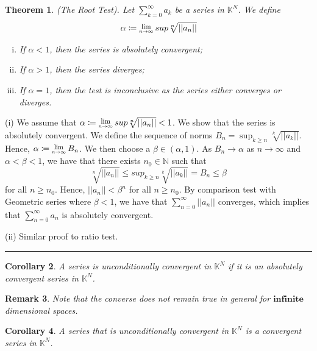 \documentclass[twoside]{article}
\newcounter{lecnum}
\newcommand{\Lim}[1]{\raisebox{0.5ex}{\scalebox{0.8}{$\displaystyle \lim_{#1}\;$}}}
\newtheorem{theorem}{Theorem}[lecnum]
\newtheorem{remark}[theorem]{Remark}
\newtheorem{corollary}[theorem]{Corollary}
\newenvironment{proof}{{\bf Proof:}}{\hfill\rule{2mm}{2mm}}
\begin{document}
\begin{theorem}(The Root Test). Let $\sum_{k=0}^{\infty}a_k$ be a series in $\mathbb{K}^N$. We define
$$
\alpha \coloneqq \Lim{n \rightarrow \infty}sup \sqrt[n]{||a_n||}
$$

\begin{enumerate}[(i)]
  \item If $\alpha < 1$, then the series is absolutely convergent;
  \item If $\alpha > 1$, then the series diverges;
  \item If $\alpha = 1$, then the test is inconclusive as the series either converges or diverges.
\end{enumerate}
\end{theorem}

\begin{proof}
(i) We assume that $\alpha \coloneqq \Lim{n \rightarrow \infty}sup\sqrt[n]{||a_n||} < 1$. We show that the series is absolutely convergent. We define the sequence of norms $B_n = \sup_{k \geq n}\sqrt[k]{||a_k||}$. Hence, $\alpha \coloneqq \Lim{n \rightarrow \infty}B_n$. We then choose a $\beta \in (\alpha,1)$. As $B_n \rightarrow \alpha$ as $n \rightarrow \infty$ and $\alpha < \beta < 1$, we have that there exists $n_0 \in \mathbb{N}$ such that
$$
\sqrt[n]{||a_n||} \leq sup_{k \geq n}\sqrt[k]{||a_k||} = B_n \leq \beta
$$
for all $n \geq n_0$. Hence, $||a_n|| < \beta^n$ for all $n \geq n_0$. By comparison test with Geometric series where $\beta < 1$, we have that $\sum_{n=0}^{\infty}||a_n||$ converges, which implies that $\sum_{n=0}^{\infty}a_n$ is absolutely convergent.

(ii)
\bigskip
Similar proof to ratio test.
\end{proof}


\begin{corollary}
A series is unconditionally convergent in $\mathbb{K}^N$ if it is an absolutely convergent series in $\mathbb{K}^N$.
\end{corollary}

\begin{remark}
Note that the converse does not remain true in general for $\textbf{infinite}$ dimensional spaces.
\end{remark}

\begin{corollary}
A series that is unconditionally convergent in $\mathbb{K}^N$ is a convergent series in $\mathbb{K}^N$.
\end{corollary}
\end{document}

